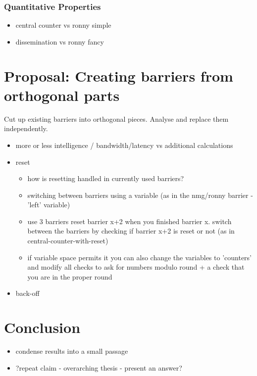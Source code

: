 \documentclass[a4paper, 10pt]{article}
\begin{document}
\subsubsection{Quantitative Properties}
\begin{itemize}
	\item central counter vs ronny simple
	\item dissemination vs ronny fancy
\end{itemize}

\section{Proposal: Creating barriers from orthogonal parts}
Cut up existing barriers into orthogonal pieces. Analyse and replace them independently.
\begin{itemize}
	\item more or less intelligence / bandwidth/latency vs additional calculations
	\item 
		reset

		\begin{itemize}
			\item how is resetting handled in currently used barriers?
			\item switching between barriers using a variable (as in the nmg/ronny barrier - 'left' variable)
			\item use 3 barriers reset barrier x+2 when you finished barrier x. switch between the barriers by checking if barrier x+2 is reset or not (as in central-counter-with-reset)
			\item if variable space permits it you can also change the variables to 'counters' and modify all checks to ask for numbers modulo round + a check that you are in the proper round
		\end{itemize}

	\item back-off
\end{itemize}

\section{Conclusion}
\begin{itemize}
	\item condense results into a small passage
	\item ?repeat claim - overarching thesis - present an answer?
\end{itemize}
\end{document}
